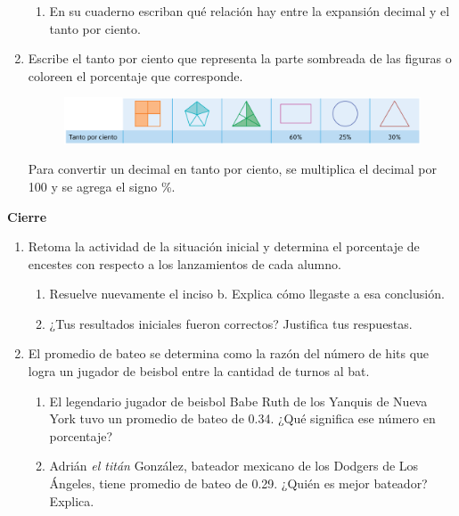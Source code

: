 \documentclass[11pt]{book}
\begin{document}
\begin{enumerate}
        \begin{enumerate}
          \item En su cuaderno escriban qué relación hay entre la expansión decimal y el tanto por
                ciento.
        \end{enumerate}
  \item Escribe el tanto por ciento que representa la parte sombreada de las
        figuras o coloreen el porcentaje que corresponde.
        \begin{figure}[H]
          \centering
          \includegraphics[width=0.8\linewidth]{tabla_figuras.png}
          \label{fig:tabla_figuras}
        \end{figure}
        \begin{boxH}
          Para convertir un decimal en tanto por ciento, se multiplica el decimal por 100 y
          se agrega el signo \%.
        \end{boxH}
\end{enumerate}

\begin{boxK}
  \begin{center}\textbf{Cierre}\end{center}

  \begin{enumerate}
    \item Retoma la actividad de la situación inicial y determina el porcentaje de encestes
          con respecto a los lanzamientos de cada alumno.
          \begin{enumerate}
            \item Resuelve nuevamente el inciso b. Explica cómo llegaste a esa conclusión.
            \item ¿Tus resultados iniciales fueron correctos? Justifica tus respuestas.
          \end{enumerate}
    \item El promedio de bateo se determina como la razón del número de hits que logra
          un jugador de beisbol entre la cantidad de turnos al bat.\\
          \begin{enumerate}
            \item  El legendario jugador de beisbol Babe Ruth de los Yanquis de Nueva York tuvo
                  un promedio de bateo de 0.34. ¿Qué significa ese número en porcentaje?
            \item Adrián \emph{el titán} González, bateador mexicano de los Dodgers de Los Ángeles,
                  tiene promedio de bateo de 0.29. ¿Quién es mejor bateador? Explica.
          \end{enumerate}
  \end{enumerate}
\end{boxK}
\newpage
\end{document}
